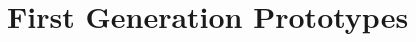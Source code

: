 \documentclass[a4paper,10pt]{article}
\begin{document}



\newpage\null\thispagestyle{empty}\newpage
\setcounter{page}{0}
\tableofcontents
{}
\restoregeometry%
\newpage

%
%
%
%
%
%
%
%
%
%
%
%	
%	
%	
%	
%

\section{First Generation Prototypes}
\label{sec:first_prototypes}


	




\end{document}
